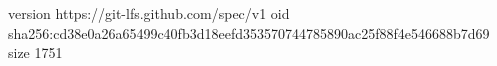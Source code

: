 version https://git-lfs.github.com/spec/v1
oid sha256:cd38e0a26a65499c40fb3d18eefd353570744785890ac25f88f4e546688b7d69
size 1751
